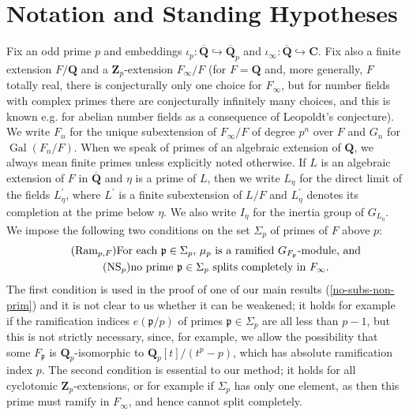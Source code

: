\documentclass[12 pt]{amsart}
\theoremstyle{plain}
\theoremstyle{definition}
\numberwithin{equation}{section}
\numberwithin{table}{section}
\begin{document}
\section{Notation and Standing Hypotheses}
\label{notation-hyp}
\indent Fix an odd prime $p$ and embeddings $\iota_p:\overline{\mathbf{Q}}\hookrightarrow\overline{\mathbf{Q}}_p$ and $\iota_\infty:\overline{\mathbf{Q}}\hookrightarrow\mathbf{C}$. Fix also a finite extension $F/\mathbf{Q}$ and a $\mathbf{Z}_p$-extension $F_\infty/F$ (for $F=\mathbf{Q}$ and, more generally, $F$ totally real, there is conjecturally only one choice for $F_\infty$, but for number fields with complex primes there are conjecturally infinitely many choices, and this is known e.g. for abelian number fields as a consequence of Leopoldt's conjecture). We write $F_n$ for the unique subextension of $F_\infty/F$ of degree $p^n$ over $F$ and $G_n$ for $\operatorname{Gal}(F_n/F)$. When we speak of primes of an algebraic extension of $\mathbf{Q}$, we always mean finite primes unless explicitly noted otherwise. If $L$ is an algebraic extension of $F$ in $\overline{\mathbf{Q}}$ and $\eta$ is a prime of $L$, then we write $L_\eta$ for the direct limit of the fields $L^\prime_\eta$, where $L^\prime$ is a finite subextension of $L/F$ and $L^\prime_\eta$ denotes its completion at the prime below $\eta$. We also write $I_\eta$ for the inertia group of $G_{L_\eta}$. We impose the following two conditions on the set $\Sigma_p$ of primes of $F$ above $p$:
\begin{gather}
\label{Ramp}\tag{Ram$_{p,F}$}\text{For each $\mathfrak{p}\in\Sigma_p$, $\mu_p$ is a ramified $G_{F_\mathfrak{p}}$-module, and}\\
\label{NSp}\tag{NS$_p$}\text{no prime $\mathfrak{p}\in\Sigma_p$ splits completely in $F_\infty$.}
\end{gather}
The first condition is used in the proof of one of our main results (\cref{no-subs-non-prim}) and it is not clear to us whether it can be weakened; it holds for example if the ramification indices $e(\mathfrak{p}/p)$ of primes $\mathfrak{p}\in\Sigma_p$ are all less than $p-1$, but this is not strictly necessary, since, for example, we allow the possibility that some $F_\mathfrak{p}$ is $\mathbf{Q}_p$-isomorphic to $\mathbf{Q}_p[t]/(t^p-p)$, which has absolute ramification index $p$. 
The second condition is essential to our method; it holds for all cyclotomic $\mathbf{Z}_p$-extensions, or for example if $\Sigma_p$ has only one element, as then this prime must ramify in $F_\infty$, and hence cannot split completely.\\%
\end{document}
